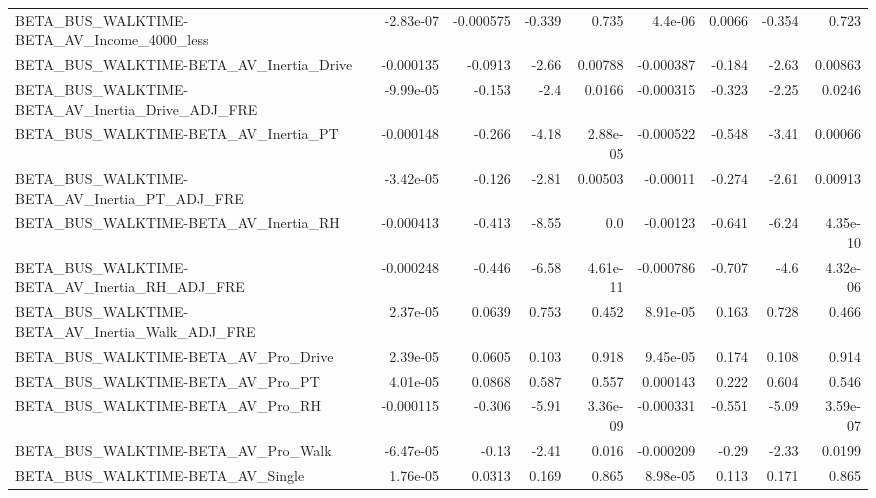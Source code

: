 \begin{tabular}{lrrrrrrrr}
BETA\_BUS\_WALKTIME-BETA\_AV\_Income\_4000\_less         &   -2.83e-07 &    -0.000575 &   -0.339 &    0.735 &    4.4e-06 &      0.0066 &       -0.354 &         0.723 \\
BETA\_BUS\_WALKTIME-BETA\_AV\_Inertia\_Drive            &   -0.000135 &      -0.0913 &    -2.66 &  0.00788 &  -0.000387 &      -0.184 &        -2.63 &       0.00863 \\
BETA\_BUS\_WALKTIME-BETA\_AV\_Inertia\_Drive\_ADJ\_FRE    &   -9.99e-05 &       -0.153 &     -2.4 &   0.0166 &  -0.000315 &      -0.323 &        -2.25 &        0.0246 \\
BETA\_BUS\_WALKTIME-BETA\_AV\_Inertia\_PT               &   -0.000148 &       -0.266 &    -4.18 & 2.88e-05 &  -0.000522 &      -0.548 &        -3.41 &       0.00066 \\
BETA\_BUS\_WALKTIME-BETA\_AV\_Inertia\_PT\_ADJ\_FRE       &   -3.42e-05 &       -0.126 &    -2.81 &  0.00503 &   -0.00011 &      -0.274 &        -2.61 &       0.00913 \\
BETA\_BUS\_WALKTIME-BETA\_AV\_Inertia\_RH               &   -0.000413 &       -0.413 &    -8.55 &      0.0 &   -0.00123 &      -0.641 &        -6.24 &      4.35e-10 \\
BETA\_BUS\_WALKTIME-BETA\_AV\_Inertia\_RH\_ADJ\_FRE       &   -0.000248 &       -0.446 &    -6.58 & 4.61e-11 &  -0.000786 &      -0.707 &         -4.6 &      4.32e-06 \\
BETA\_BUS\_WALKTIME-BETA\_AV\_Inertia\_Walk\_ADJ\_FRE     &    2.37e-05 &       0.0639 &    0.753 &    0.452 &   8.91e-05 &       0.163 &        0.728 &         0.466 \\
BETA\_BUS\_WALKTIME-BETA\_AV\_Pro\_Drive                &    2.39e-05 &       0.0605 &    0.103 &    0.918 &   9.45e-05 &       0.174 &        0.108 &         0.914 \\
BETA\_BUS\_WALKTIME-BETA\_AV\_Pro\_PT                   &    4.01e-05 &       0.0868 &    0.587 &    0.557 &   0.000143 &       0.222 &        0.604 &         0.546 \\
BETA\_BUS\_WALKTIME-BETA\_AV\_Pro\_RH                   &   -0.000115 &       -0.306 &    -5.91 & 3.36e-09 &  -0.000331 &      -0.551 &        -5.09 &      3.59e-07 \\
BETA\_BUS\_WALKTIME-BETA\_AV\_Pro\_Walk                 &   -6.47e-05 &        -0.13 &    -2.41 &    0.016 &  -0.000209 &       -0.29 &        -2.33 &        0.0199 \\
BETA\_BUS\_WALKTIME-BETA\_AV\_Single                   &    1.76e-05 &       0.0313 &    0.169 &    0.865 &   8.98e-05 &       0.113 &        0.171 &         0.865 \\

\end{tabular}
